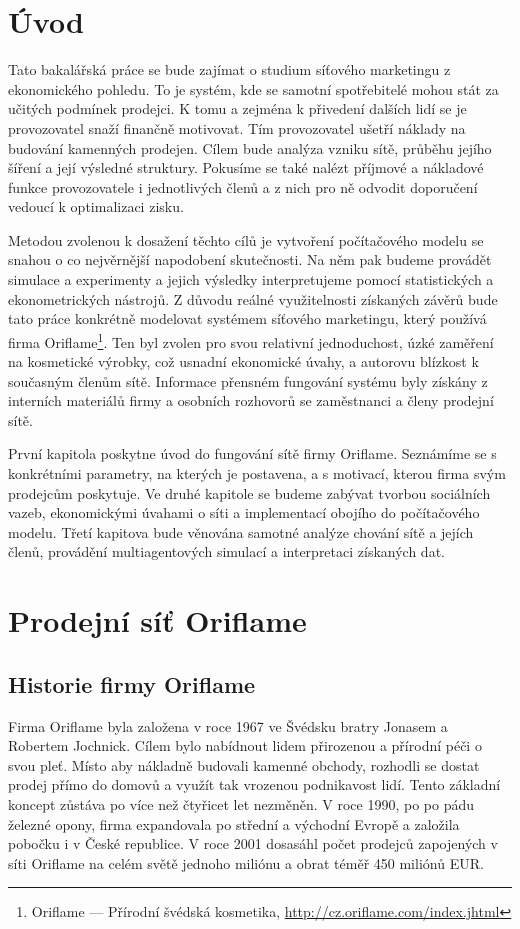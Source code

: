 \documentclass[a4wide,12pt]{report}
\begin{document}
\chapter*{Úvod}
Tato bakalářská práce se bude zajímat o studium síťového marketingu z ekonomického pohledu. To je systém, kde se samotní spotřebitelé mohou stát za učitých podmínek prodejci. K tomu a zejména k přivedení dalších lidí se je provozovatel snaží finančně motivovat. Tím provozovatel ušetří náklady na budování kamenných prodejen. Cílem bude analýza vzniku sítě, průběhu jejího šíření a její výsledné struktury. Pokusíme se také nalézt příjmové a nákladové funkce provozovatele i jednotlivých členů a z nich pro ně odvodit doporučení vedoucí k optimalizaci zisku.

Metodou zvolenou k dosažení těchto cílů je vytvoření počítačového modelu se snahou o co nejvěrnější napodobení skutečnosti. Na něm pak budeme provádět simulace a experimenty a jejich výsledky interpretujeme pomocí statistických a ekonometrických nástrojů. Z důvodu reálné využitelnosti získaných závěrů bude tato práce konkrétně modelovat systémem síťového marketingu, který používá firma Oriflame\footnote{Oriflame --- Přírodní švédská kosmetika, \url{http://cz.oriflame.com/index.jhtml}}. Ten byl zvolen pro svou relativní jednoduchost, úzké zaměření na kosmetické výrobky, což usnadní ekonomické úvahy, a autorovu blízkost k současným členům sítě. Informace přensném fungování systému byly získány z interních materiálů firmy a osobních rozhovorů se zaměstnanci a členy prodejní sítě.

První kapitola poskytne úvod do fungování sítě firmy Oriflame. Seznámíme se s konkrétními parametry, na kterých je postavena, a s motivací, kterou firma svým prodejcům poskytuje. Ve druhé kapitole se budeme zabývat tvorbou sociálních vazeb, ekonomickými úvahami o síti a implementací obojího do počítačového modelu. Třetí kapitova bude věnována samotné analýze chování sítě a jejích členů, provádění multiagentových simulací a interpretaci získaných dat.
\chapter{Prodejní síť Oriflame}
\section{Historie firmy Oriflame}
Firma Oriflame byla založena v roce 1967 ve Švédsku bratry Jonasem a Robertem Jochnick. Cílem bylo nabídnout lidem přirozenou a přírodní péči o svou pleť. Místo aby nákladně budovali kamenné obchody, rozhodli se dostat prodej přímo do domovů a využít tak vrozenou podnikavost lidí. Tento základní koncept zůstáva po více než čtyřicet let nezměněn. V roce 1990, po po pádu železné opony, firma expandovala po střední a východní Evropě a založila pobočku i v České republice. V roce 2001 dosasáhl počet prodejců zapojených v síti Oriflame na celém světě jednoho miliónu a obrat téměř 450 miliónů EUR.
\end{document}
